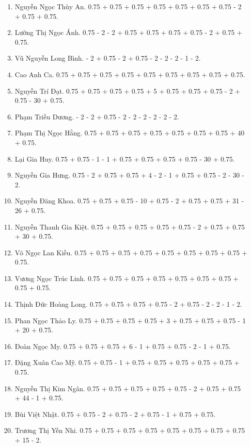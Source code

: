 \documentclass{article}
\begin{document}
\begin{enumerate}
	\item {\sc Nguyễn Ngọc Thùy An.} 0.75 + 0.75 + 0.75 + 0.75 + 0.75 + 0.75 + 0.75 - 2 + 0.75 + 0.75.
	\item {\sc Lường Thị Ngọc Ánh.} 0.75 - 2 - 2 + 0.75 + 0.75 + 0.75 + 0.75 - 2 + 0.75 + 0.75.
	\item {\sc Vũ Nguyễn Long Bình.} - 2 + 0.75 - 2 + 0.75 - 2 - 2 - 2 - 1 - 2.
	\item {\sc Cao Anh Ca.} 0.75 + 0.75 + 0.75 + 0.75 + 0.75 + 0.75 + 0.75 + 0.75 + 0.75.
	\item {\sc Nguyễn Trí Đạt.} 0.75 + 0.75 + 0.75 + 0.75 + 5 + 0.75 + 0.75 + 0.75 - 2 + 0.75 - 30 + 0.75.
	\item {\sc Phạm Triều Dương.} - 2 - 2 + 0.75 - 2 - 2 - 2 - 2 - 2 - 2.
	\item {\sc Phạm Thị Ngọc Hằng.} 0.75 + 0.75 + 0.75 + 0.75 + 0.75 + 0.75 + 0.75 + 40 + 0.75.
	\item {\sc Lại Gia Huy.} 0.75 + 0.75 - 1 - 1 + 0.75 + 0.75 + 0.75 + 0.75 - 30 + 0.75.
	\item {\sc Nguyễn Gia Hưng.} 0.75 - 2 + 0.75 + 0.75 + 4 - 2 - 1 + 0.75 + 0.75 - 2 - 30 - 2.
	\item {\sc Nguyễn Đăng Khoa.} 0.75 + 0.75 + 0.75 - 10 + 0.75 - 2 + 0.75 + 0.75 + 31 - 26 + 0.75.
	\item {\sc Nguyễn Thanh Gia Kiệt.} 0.75 + 0.75 + 0.75 + 0.75 + 0.75 - 2 + 0.75 + 0.75 + 30 + 0.75.
	\item {\sc Võ Ngọc Lan Kiều.} 0.75 + 0.75 + 0.75 + 0.75 + 0.75 + 0.75 + 0.75 + 0.75 + 0.75.
	\item {\sc Vương Ngọc Trúc Linh.} 0.75 + 0.75 + 0.75 + 0.75 + 0.75 + 0.75 + 0.75 + 0.75 + 0.75.
	\item {\sc Thịnh Đức Hoàng Long.} 0.75 + 0.75 + 0.75 + 0.75 - 2 + 0.75 - 2 - 2 - 1 - 2.
	\item {\sc Phan Ngọc Thảo Ly.} 0.75 + 0.75 + 0.75 + 0.75 + 3 + 0.75 + 0.75 + 0.75 - 1 + 20 + 0.75.
	\item {\sc Đoàn Ngọc My.} 0.75 + 0.75 + 0.75 + 6 - 1 + 0.75 + 0.75 - 2 - 1 + 0.75.
	\item {\sc Đặng Xuân Cao Mỹ.} 0.75 + 0.75 - 1 + 0.75 + 0.75 + 0.75 + 0.75 + 0.75 + 0.75.
	\item {\sc Nguyễn Thị Kim Ngân.} 0.75 + 0.75 + 0.75 + 0.75 + 0.75 - 2 + 0.75 + 0.75 + 44 - 1 + 0.75.
	\item {\sc Bùi Việt Nhật.} 0.75 + 0.75 - 2 + 0.75 - 2 + 0.75 - 1 + 0.75 + 0.75.
	\item {\sc Trương Thị Yến Nhi.} 0.75 + 0.75 + 0.75 + 0.75 + 0.75 + 0.75 + 0.75 + 0.75 + 15 - 2.

\end{enumerate}
\end{document}
